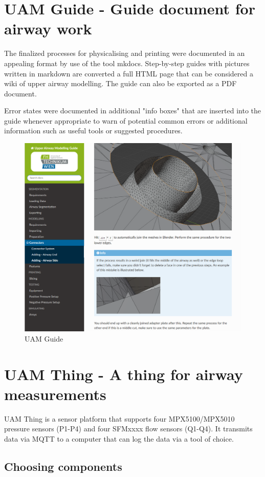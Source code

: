 \documentclass[MME,Projekt,english]{twbook}%
\begin{document}
\section{UAM Guide - Guide document for airway work}

The finalized processes for physicalising and printing were documented in an appealing format by use of the
tool mkdocs. Step-by-step guides with pictures written in markdown are converted a full HTML page that can be considered
a wiki of upper airway modelling. The guide can also be exported as a PDF document.

Error states were documented in additional "info boxes" that are inserted into the guide whenever appropriate to warn
of potential common errors or additional information such as useful tools or suggested procedures.

\begin{figure}[!htbp]
	\centering
	\includegraphics[width=.8\linewidth]{images/uam-guide.png}
	\caption{UAM Guide}\label{uam-guide}
\end{figure}

\section{UAM Thing - A thing for airway measurements}

UAM Thing is a sensor platform that supports four MPX5100/MPX5010 pressure sensors (P1-P4) and four SFMxxxx flow sensors (Q1-Q4). It transmits
data via MQTT to a computer that can log the data via a tool of choice.

\subsection{Choosing components}
\end{document}

